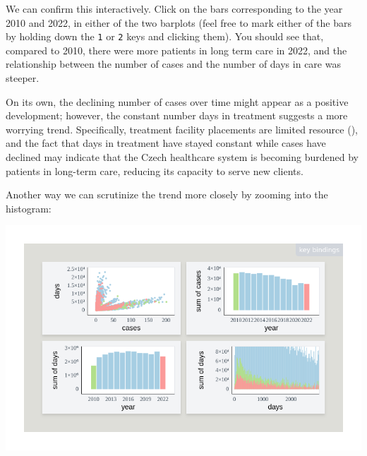 \documentclass[
]{book}
\newenvironment{Shaded}{\begin{snugshade}}{\end{snugshade}}
\newcommand{\AttributeTok}[1]{\textcolor[rgb]{0.13,0.29,0.53}{#1}}
\newcommand{\DecValTok}[1]{\textcolor[rgb]{0.00,0.00,0.81}{#1}}
\newcommand{\FloatTok}[1]{\textcolor[rgb]{0.00,0.00,0.81}{#1}}
\newcommand{\FunctionTok}[1]{\textcolor[rgb]{0.13,0.29,0.53}{\textbf{#1}}}
\newcommand{\NormalTok}[1]{#1}
\newcommand{\SpecialCharTok}[1]{\textcolor[rgb]{0.81,0.36,0.00}{\textbf{#1}}}
\newcommand{\StringTok}[1]{\textcolor[rgb]{0.31,0.60,0.02}{#1}}
\theoremstyle{definition}
\theoremstyle{definition}
\theoremstyle{definition}
\theoremstyle{definition}
\theoremstyle{remark}
\begin{document}
We can confirm this interactively. Click on the bars corresponding to the year 2010 and 2022, in either of the two barplots (feel free to mark either of the bars by holding down the \texttt{1} or \texttt{2} keys and clicking them). You should see that, compared to 2010, there were more patients in long term care in 2022, and the relationship between the number of cases and the number of days in care was steeper.

On its own, the declining number of cases over time might appear as a positive development; however, the constant number days in treatment suggests a more worrying trend. Specifically, treatment facility placements are limited resource (), and the fact that days in treatment have stayed constant while cases have declined may indicate that the Czech healthcare system is becoming burdened by patients in long-term care, reducing its capacity to serve new clients.

Another way we can scrutinize the trend more closely by zooming into the histogram:

\begin{Shaded}
\end{Shaded}

\begin{center}\includegraphics[width=1\linewidth,height=1\textheight]{./figures/example-cases-days-time-zoom} \end{center}
\end{document}
